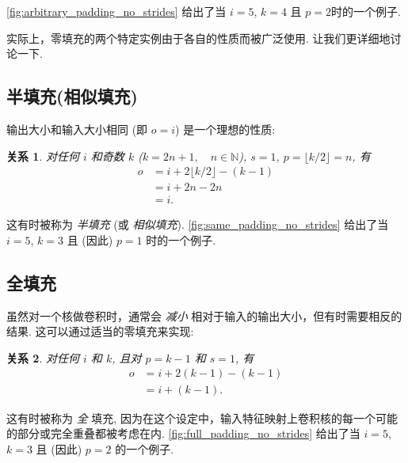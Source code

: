 \documentclass[notitlepage]{ctexrep}
\newtheorem{relationship}{关系}
\begin{document}
\noindent \autoref{fig:arbitrary_padding_no_strides} 给出了当 $i
= 5$, $k = 4$ 且 $p = 2$时的一个例子.

实际上，零填充的两个特定实例由于各自的性质而被广泛使用. 让我们更详细地讨论一下.

\subsection{半填充(相似填充)}

输出大小和输入大小相同 (即 $o = i$) 是一个理想的性质:

\begin{relationship}\label{rel:same_padding_no_strides}
对任何 $i$ 和奇数 $k$ ($k = 2n + 1, \quad n \in \mathbb{N}$), $s = 1$, $p = \lfloor k / 2 \rfloor = n$, 有
\begin{equation*}
\begin{split}
    o &= i + 2 \lfloor k / 2 \rfloor - (k - 1) \\
      &= i + 2n - 2n \\
      &= i.
\end{split}
\end{equation*}
\end{relationship}

\noindent 这有时被称为 {\em 半填充\/} (或 {\em 相似填充\/}). \autoref{fig:same_padding_no_strides} 给出了当
$i = 5$, $k = 3$ 且 (因此) $p = 1$ 时的一个例子.

\subsection{全填充}

虽然对一个核做卷积时，通常会 {\em 减小\/} 相对于输入的输出大小，但有时需要相反的结果. 这可以通过适当的零填充来实现:

\begin{relationship}\label{rel:full_padding_no_strides}
对任何 $i$ 和 $k$, 且对 $p = k - 1$ 和 $s = 1$, 有
\begin{equation*}
\begin{split}
    o &= i + 2(k - 1) - (k - 1) \\
      &= i + (k - 1).
\end{split}
\end{equation*}
\end{relationship}

\noindent 这有时被称为 {\em 全} 填充, 因为在这个设定中，输入特征映射上卷积核的每一个可能的部分或完全重叠都被考虑在内. \autoref{fig:full_padding_no_strides}
给出了当 $i = 5$, $k = 3$ 且 (因此) $p = 2$ 的一个例子.
\end{document}
